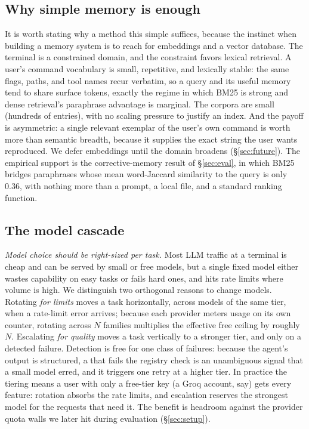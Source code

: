 \subsection{Why simple memory is enough}
\label{sec:whysimple}

It is worth stating why a method this simple suffices, because the instinct when
building a memory system is to reach for embeddings and a vector database. The terminal
is a constrained domain, and the constraint favors lexical retrieval. A user's command
vocabulary is small, repetitive, and lexically stable: the same flags, paths, and tool
names recur verbatim, so a query and its useful memory tend to share surface tokens,
exactly the regime in which BM25 is strong and dense retrieval's paraphrase advantage
is marginal. The corpora are small (hundreds of entries), with no scaling pressure
to justify an index. And the payoff is asymmetric: a single relevant exemplar
of the user's own command is worth more than semantic breadth, because it supplies the
exact string the user wants reproduced. We defer embeddings until the domain broadens (\S\ref{sec:future}). The empirical support is the
corrective-memory result of \S\ref{sec:eval}, in which BM25 bridges paraphrases whose
mean word-Jaccard similarity to the query is only 0.36, with nothing more than a
prompt, a local file, and a standard ranking function.

\subsection{The model cascade}
\label{sec:cascade}

\emph{Model choice should be right-sized per task.} Most LLM traffic at a terminal is
cheap and can be served by small or free models, but a single fixed model either
wastes capability on easy tasks or fails hard ones, and hits rate limits where volume
is high. We distinguish two
orthogonal reasons to change models. Rotating \emph{for limits} moves a task
horizontally, across models of the same tier, when a rate-limit error arrives; because
each provider meters usage on its own counter, rotating across $N$ families multiplies
the effective free ceiling by roughly $N$. Escalating \emph{for
quality} moves a task vertically to a stronger tier, and only on a detected failure.
Detection is free for one class of failures: because the agent's output is structured, a
 that fails the registry check is an unambiguous signal that a small model
erred, and it triggers one retry at a higher tier. In practice the tiering means a
user with only a free-tier key (a Groq account, say) gets every feature: rotation
absorbs the rate limits, and escalation reserves the strongest model for the requests
that need it. The benefit is headroom against the
provider quota walls we later hit during evaluation (\S\ref{sec:setup}).

